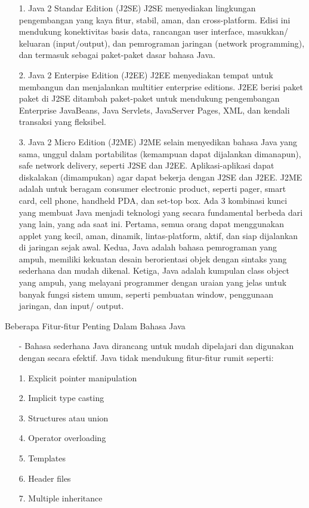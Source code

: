 \documentclass{jtetiproposalskripsi}
\begin{document}
\begin{itemize}
\item[1.] Java   2   Standar   Edition   (J2SE)
J2SE  menyediakan   lingkungan pengembangan yang kaya fitur,  stabil,  aman,  dan  cross-platform. Edisi ini mendukung konektivitas  basis  data,   rancangan  user   interface,  masukkan/ keluaran (input/output), dan pemrograman jaringan (network programming), dan termasuk sebagai paket-paket dasar bahasa Java.
\item[2.] Java   2   Enterpise   Edition   (J2EE)
J2EE   menyediakan   tempat   untuk membangun   dan  menjalankan  multitier   enterprise   editions.   J2EE   berisi paket paket di J2SE ditambah paket-paket untuk mendukung pengembangan Enterprise JavaBeans,  Java Servlets,  JavaServer Pages,  XML, dan kendali transaksi yang fleksibel.
\item[3.] Java 2 Micro Edition (J2ME)
J2ME selain menyedikan bahasa Java yang sama, unggul dalam portabilitas (kemampuan dapat dijalankan dimanapun), safe   network   delivery,   seperti   J2SE   dan   J2EE.   Aplikasi-aplikasi   dapat diskalakan (dimampukan) agar dapat bekerja dengan J2SE dan J2EE. J2ME adalah untuk beragam  consumer  electronic product,  seperti  pager,  smart  card, cell phone, handheld PDA, dan set-top box.
Ada   3   kombinasi   kunci   yang   membuat   Java   menjadi   teknologi   yang   secara fundamental berbeda dari yang lain, yang ada saat ini. Pertama,  semua orang dapat menggunakan  applet  yang   kecil,   aman,   dinamik,   lintas-platform,   aktif,   dan   siap dijalankan di   jaringan  sejak awal.  Kedua,   Java adalah bahasa pemrograman yang ampuh,  memiliki kekuatan desain berorientasi objek dengan sintaks yang sederhana dan mudah dikenal.  Ketiga,  Java adalah kumpulan  class object  yang ampuh,  yang melayani  programmer  dengan uraian yang jelas untuk banyak fungsi sistem umum, seperti pembuatan window, penggunaan jaringan, dan input/ output.

\end{itemize}


Beberapa Fitur-fitur Penting Dalam Bahasa Java

\begin{itemize}
\item[-] Bahasa sederhana
Java dirancang untuk mudah dipelajari dan digunakan dengan secara efektif. Java tidak mendukung fitur-fitur rumit seperti:

\item[1.] Explicit pointer manipulation
\item[2.] Implicit type casting
\item[3.] Structures atau union
\item[4.] Operator overloading
\item[5.] Templates
\item[6.] Header files
\item[7.] Multiple inheritance
\end{itemize}
\end{document}
